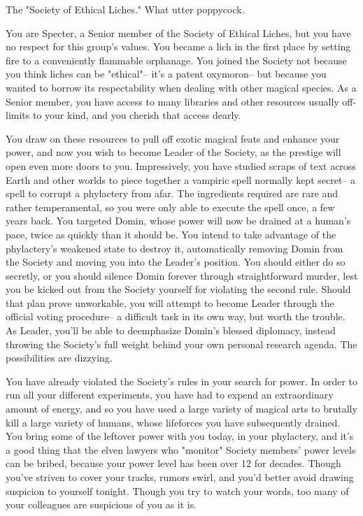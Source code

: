 \documentclass[char]{Sel}
\begin{document}
\name{\cSpecter{}}
The "Society of Ethical Liches." What utter poppycock.

You are Specter, a Senior member of the Society of Ethical Liches, but you have no respect for this group's values. You became a lich in the first place by setting fire to a conveniently flammable orphanage. You joined the Society not because you think liches can be "ethical"-- it's a patent oxymoron-- but because you wanted to borrow its respectability when dealing with other magical species. As a Senior member, you have access to many libraries and other resources usually off-limits to your kind, and you cherish that access dearly.

You draw on these resources to pull off exotic magical feats and enhance your power, and now you wish to become Leader of the Society, as the prestige will open even more doors to you. Impressively, you have studied scraps of text across Earth and other worlds to piece together a vampiric spell normally kept secret-- a spell to corrupt a phylactery from afar. The ingredients required are rare and rather temperamental, so you were only able to execute the spell once, a few years back. You targeted Domin, whose power will now be drained at a human's pace, twice as quickly than it should be. You intend to take advantage of the phylactery's weakened state to destroy it, automatically removing Domin from the Society and moving you into the Leader's position. You should either do so secretly, or you should silence Domin forever through straightforward murder, lest you be kicked out from the Society yourself for violating the second rule. Should that plan prove unworkable, you will attempt to become Leader through the official voting procedure-- a difficult task in its own way, but worth the trouble. As Leader, you'll be able to deemphasize Domin's blessed diplomacy, instead throwing the Society's full weight behind your own personal research agenda. The possibilities are dizzying.

You have already violated the Society's rules in your search for power. In order to run all your different experiments, you have had to expend an extraordinary amount of energy, and so you have used a large variety of magical arts to brutally kill a large variety of humans, whose lifeforces you have subsequently drained. You bring some of the leftover power with you today, in your phylactery, and it's a good thing that the elven lawyers who "monitor" Society members' power levels can be bribed, because your power level has been over 12 for decades. Though you've striven to cover your tracks, rumors swirl, and you'd better avoid drawing suspicion to yourself tonight. Though you try to watch your words, too many of your colleagues are suspicious of you as it is.
\end{document}
